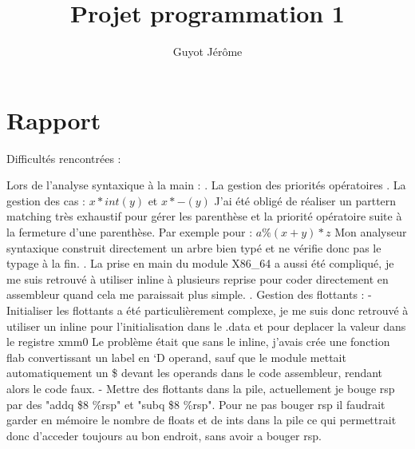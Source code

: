 \documentclass{article}
\title{Projet programmation 1}
\author{Guyot Jérôme}
\begin{document}
\maketitle

\newcommand\tab[1][1cm]{\hspace*{#1}}

\section*{Rapport}

    Difficultés rencontrées :\newline
    
    Lors de l'analyse syntaxique à la main : \newline 
        \tab. La gestion des priorités opératoires \newline
        \tab. La gestion des cas : $x*int(y)$ et $x*-(y)$ \newline
        \tab J'ai été obligé de réaliser un parttern matching très exhaustif pour gérer les parenthèse et la priorité opératoire suite à la fermeture d'une parenthèse. Par exemple pour : $a \% (x + y) * z$       \newline
        \tab Mon analyseur syntaxique construit directement un arbre bien typé et ne vérifie donc pas le typage à la fin. 
        \newline
        \newline
        \tab. La prise en main du module X86\_64 a aussi été compliqué, je me suis retrouvé à utiliser inline à plusieurs reprise pour coder directement en assembleur quand cela me paraissait plus simple. \newline
        \newline
        \tab. Gestion des flottants :\newline
        \tab \tab - Initialiser les flottants a été particulièrement complexe, je me suis donc retrouvé à utiliser un inline pour l'initialisation dans le .data et pour deplacer la valeur dans le registre xmm0
        Le problème était que sans le inline, j'avais crée une fonction flab convertissant un label en `D operand, sauf que le module mettait automatiquement un \$ devant les operands dans le code assembleur, rendant alors le code faux.\newline
        \tab \tab - Mettre des flottants dans la pile, actuellement je bouge rsp par des "addq \$8 \%rsp" et "subq \$8 \%rsp". Pour ne pas bouger rsp il faudrait garder en mémoire le nombre de floats et de ints dans la pile ce qui permettrait donc d'acceder toujours au bon endroit, sans avoir a bouger rsp.\newline
\end{document}
